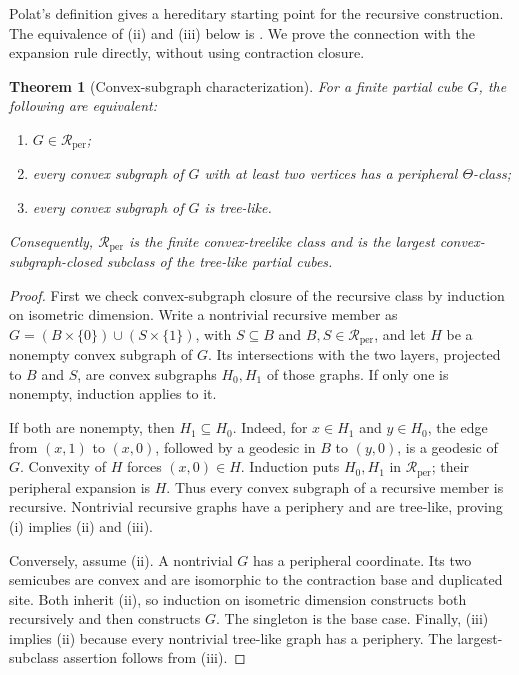 \documentclass[11pt]{article}
\newtheorem{theorem}{Theorem}[section]
\theoremstyle{definition}
\theoremstyle{remark}
\newcommand{\Rper}{\mathcal R_{\mathrm{per}}}
\begin{document}
Polat's definition gives a hereditary starting point for the recursive
construction. The equivalence of (ii) and (iii) below is
\cite[Proposition~5.6]{Polat12treelike}. We prove the connection with the
expansion rule directly, without using contraction closure.

\begin{theorem}[Convex-subgraph characterization]
\label{thm:convex-characterization}
For a finite partial cube \(G\), the following are equivalent:
\begin{enumerate}[label=\textup{(\roman*)}]
  \item \(G\in\Rper\);
  \item every convex subgraph of \(G\) with at least two vertices has a
        peripheral \(\Theta\)-class;
  \item every convex subgraph of \(G\) is tree-like.
\end{enumerate}
Consequently, \(\Rper\) is the finite convex-treelike class and is the
largest convex-subgraph-closed subclass of the tree-like partial cubes.
\end{theorem}

\begin{proof}
First we check convex-subgraph closure of the recursive class by induction
on isometric dimension. Write a nontrivial recursive member as
\(G=(B\times\{0\})\cup(S\times\{1\})\), with \(S\subseteq B\) and
\(B,S\in\Rper\), and let \(H\) be a nonempty convex subgraph of \(G\).
Its intersections with the two layers, projected to \(B\) and \(S\),
are convex subgraphs \(H_0,H_1\) of those graphs. If only one is nonempty,
induction applies to it.

If both are nonempty, then \(H_1\subseteq H_0\). Indeed, for
\(x\in H_1\) and \(y\in H_0\), the edge from \((x,1)\) to \((x,0)\),
followed by a geodesic in \(B\) to \((y,0)\), is a geodesic of \(G\).
Convexity of \(H\) forces \((x,0)\in H\). Induction puts \(H_0,H_1\)
in \(\Rper\); their peripheral expansion is \(H\). Thus every convex
subgraph of a recursive member is recursive. Nontrivial recursive graphs
have a periphery and are tree-like, proving (i) implies (ii) and (iii).

Conversely, assume (ii). A nontrivial \(G\) has a peripheral coordinate.
Its two semicubes are convex and are isomorphic to the contraction base
and duplicated site. Both inherit (ii), so induction on isometric dimension
constructs both recursively and then constructs \(G\). The singleton is
the base case. Finally, (iii) implies (ii) because every nontrivial tree-like
graph has a periphery. The largest-subclass assertion follows from (iii).
\end{proof}
\end{document}
